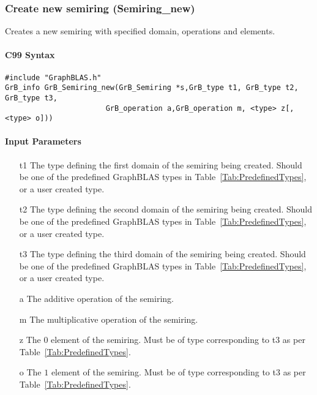 \subsubsection{Create new semiring ({\sf Semiring\_new})}

Creates a new semiring with specified domain, operations and elements.

\paragraph{C99 Syntax}

\begin{verbatim}
#include "GraphBLAS.h"
GrB_info GrB_Semiring_new(GrB_Semiring *s,GrB_type t1, GrB_type t2, GrB_type t3,
                       GrB_operation a,GrB_operation m, <type> z[, <type> o]))
\end{verbatim}


\paragraph{Input Parameters}

\begin{itemize}
	\item[{\sf t1}] The type defining the first domain of the semiring being created. Should be one of the predefined
	GraphBLAS types in Table~\ref{Tab:PredefinedTypes}, or a user created type.
	\item[{\sf t2}] The type defining the second domain of the semiring being created. Should be one of the predefined
	GraphBLAS types in Table~\ref{Tab:PredefinedTypes}, or a user created type.
	\item[{\sf t3}] The type defining the third domain of the semiring being created. Should be one of the predefined
	GraphBLAS types in Table~\ref{Tab:PredefinedTypes}, or a user created type.
	\item[{\sf a}] The additive operation of the semiring.
	\item[{\sf m}] The multiplicative operation of the semiring.
	\item[{\sf z}] The $0$ element of the semiring. Must be of type corresponding to {\sf t3} as per Table~\ref{Tab:PredefinedTypes}.
	\item[{\sf o}] The $1$ element of the semiring. Must be of type corresponding to {\sf t3} as per Table~\ref{Tab:PredefinedTypes}.
\end{itemize}

